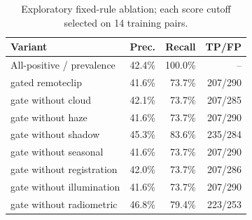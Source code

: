 \begin{table}[t]
\caption{Exploratory fixed-rule ablation; each score cutoff selected on 14 training pairs.}
\label{tab:gate}
\centering
\begin{tabular}{lrrr}
\hline
Variant & Prec. & Recall & TP/FP \\
\hline
All-positive / prevalence & 42.4\% & 100.0\% & -- \\
gated remoteclip & 41.6\% & 73.7\% & 207/290 \\
gate without cloud & 42.1\% & 73.7\% & 207/285 \\
gate without haze & 41.6\% & 73.7\% & 207/290 \\
gate without shadow & 45.3\% & 83.6\% & 235/284 \\
gate without seasonal & 41.6\% & 73.7\% & 207/290 \\
gate without registration & 42.0\% & 73.7\% & 207/286 \\
gate without illumination & 41.6\% & 73.7\% & 207/290 \\
gate without radiometric & 46.8\% & 79.4\% & 223/253 \\
\hline
\end{tabular}
\end{table}
